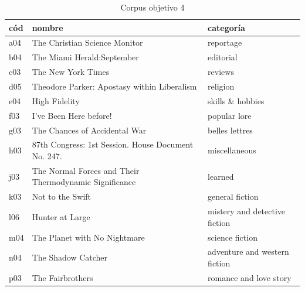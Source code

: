 \documentclass[twoside]{article}
\begin{document}
   \begin{table}[!ht]
      \centering
 \begin{tabular}{|l|l|l|}
 \hline
cód & nombre & categoría \\ \hline
        a04 & The Christian Science Monitor & reportage \\ \hline
        b04 & The Miami Herald:September & editorial \\ \hline
        c03 & The New York Times & reviews \\ \hline
        d05 & Theodore Parker: Apostasy within Liberalism & religion \\ \hline
        e04 & High Fidelity & skills \& hobbies \\ \hline
        f03 & I've Been Here before! & popular lore \\ \hline
        g03 & The Chances of Accidental War & belles lettres \\ \hline
        h03 & 87th Congress: 1st Session. House Document No. 247. & miscellaneous \\ \hline
        j03 & The Normal Forces and Their Thermodynamic Significance & learned \\ \hline
        k03 & Not to the Swift & general fiction \\ \hline
        l06 & Hunter at Large & mistery and detective fiction \\ \hline
        m04 & The Planet with No Nightmare & science fiction \\ \hline
        n04 & The Shadow Catcher & adventure and western fiction \\ \hline
        p03 & The Fairbrothers & romance and love story \\ \hline
     
      

      \end{tabular}
  \caption{Corpus objetivo 4}
  \label{tab:corpus_objetivo4}
  \end{table}
\end{document}
